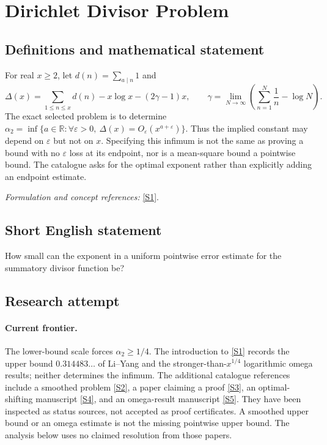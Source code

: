 \documentclass[11pt,a4paper]{article}
\newcommand{\R}{\mathbb{R}}
\newcommand{\eps}{\varepsilon}
\newcommand{\sref}[2]{\hyperlink{source:#1:#2}{[S#2]}}
\newif\ifshowcatalogue
\newcommand{\cataloguescope}[1]{\ifshowcatalogue
 \paragraph{Exact scope in the supplied catalogue.}
 \begin{quote}\small #1\end{quote}\fi}
\numberwithin{equation}{section}
\begin{document}
\setcounter{section}{169}
\clearpage
\section{\texorpdfstring{Dirichlet Divisor Problem}{Dirichlet Divisor Problem}}\label{170}
\subsection{Definitions and mathematical statement}
For real $x\ge2$, let $d(n)=\sum_{a\mid n}1$ and
\[
 \Delta(x)=\sum_{1\le n\le x}d(n)-x\log x-(2\gamma-1)x,
 \qquad \gamma=\lim_{N\to\infty}\left(\sum_{n=1}^N\frac1n-\log N\right).
\]
The exact selected problem is to determine
$\alpha_2=\inf\{a\in\R:\forall\eps>0,\ \Delta(x)=O_\eps(x^{a+\eps})\}$.
Thus the implied constant may depend on $\eps$ but not on $x$. Specifying this infimum is not the same as proving a bound with no $\eps$ loss at its endpoint, nor is a mean-square bound a pointwise bound. The catalogue asks for the optimal exponent rather than explicitly adding an endpoint estimate.
\par\smallskip\textit{Formulation and concept references:} \sref{170}{1}.
\cataloguescope{Let d(n) count the positive divisors of n and Delta(x)=sum\_\{n<=x\} d(n)-x log x-(2 gamma-1)x for real x>=2. Determine the optimal exponent alpha\_2=inf\{a: for every epsilon>0, Delta(x)=O\_epsilon(x\textasciicircum{}(a+epsilon)) as x tends to infinity\}.}
\subsection{Short English statement}
How small can the exponent in a uniform pointwise error estimate for the summatory divisor function be?
\subsection{Research attempt}

\paragraph{Current frontier.}
The lower-bound scale forces $\alpha_2\ge1/4$. The introduction to
\sref{170}{1} records the upper bound $0.314483\ldots$ of Li--Yang and the
stronger-than-$x^{1/4}$ logarithmic omega results; neither determines the
infimum. The additional catalogue references include a smoothed problem
\sref{170}{2}, a paper claiming a proof \sref{170}{3}, an optimal-shifting
manuscript \sref{170}{4}, and an omega-result manuscript \sref{170}{5}.
They have been inspected as status sources, not accepted as proof
certificates. A smoothed upper bound or an omega estimate is not the missing
pointwise upper bound. The analysis below uses no claimed resolution from
those papers.
\end{document}
